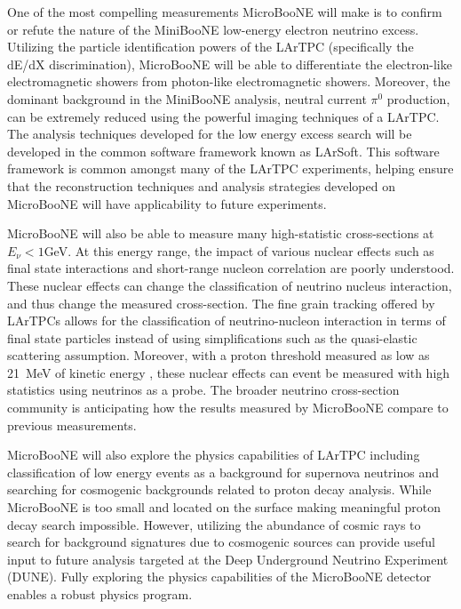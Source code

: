 One of the most compelling measurements MicroBooNE will make is to confirm or refute the nature of the MiniBooNE low-energy electron neutrino excess. Utilizing the particle identification powers of the LArTPC (specifically the dE/dX discrimination), MicroBooNE will be able to differentiate the electron-like electromagnetic showers from photon-like electromagnetic showers. Moreover, the dominant background in the MiniBooNE analysis, neutral current $\pi^{0}$ production, can be extremely reduced using the powerful imaging techniques of a LArTPC. The analysis techniques developed for the low energy excess search will be developed in the common software framework known as LArSoft. This software framework is common amongst many of the LArTPC experiments, helping ensure that the reconstruction techniques and analysis strategies developed on MicroBooNE will have applicability to future experiments.

MicroBooNE will also be able to measure many high-statistic cross-sections at $E_{\nu} < 1$GeV. At this energy range, the impact of various nuclear effects such as final state interactions and short-range nucleon correlation are poorly understood. These nuclear effects can change the classification of neutrino nucleus interaction, and thus change the measured cross-section. The fine grain tracking offered by LArTPCs allows for the classification of neutrino-nucleon interaction in terms of final state particles instead of using simplifications such as the quasi-elastic scattering assumption. Moreover, with a proton threshold measured as low as 21~MeV of kinetic energy \cite{Argoneut}, these nuclear effects can event be measured with high statistics using neutrinos as a probe. The broader neutrino cross-section community is anticipating how the results measured by MicroBooNE compare to previous measurements.

MicroBooNE will also explore the physics capabilities of LArTPC including classification of low energy events as a background for supernova neutrinos and searching for cosmogenic backgrounds related to proton decay analysis. While MicroBooNE is too small and located on the surface making meaningful proton decay search impossible. However, utilizing the abundance of cosmic rays to search for background signatures due to cosmogenic sources can provide useful input to future analysis targeted at the Deep Underground Neutrino Experiment (DUNE). Fully exploring the physics capabilities of the MicroBooNE detector enables a robust physics program. 

